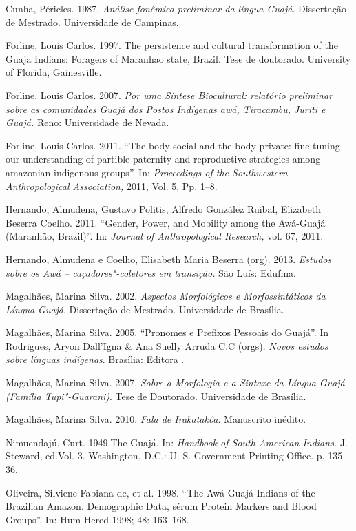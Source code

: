 \begin{Parskip}
Cunha, Péricles. 1987. \emph{Análise fonêmica preliminar da língua
Guajá}. Dissertação de Mestrado. Universidade de Campinas.

Forline, Louis Carlos. 1997. The persistence and cultural transformation
of the Guaja Indians: Foragers of Maranhao state, Brazil. Tese de
doutorado. University of Florida, Gainesville.

Forline, Louis Carlos. 2007. \emph{Por uma Síntese Biocultural:
relatório preliminar sobre as comunidades Guajá dos Postos Indígenas
awá, Tiracambu, Juriti e Guajá.} Reno: Universidade de Nevada.

Forline, Louis Carlos. 2011. ``The body social and the body private: fine
tuning our understanding of partible paternity and reproductive
strategies among amazonian indigenous groups''. In: \emph{Proceedings of
the Southwestern Anthropological Association,} 2011, Vol. 5, Pp. 1--8.

Hernando, Almudena, Gustavo Politis, Alfredo González Ruibal, Elizabeth
Beserra Coelho. 2011. ``Gender, Power, and Mobility among the Awá-Guajá
(Maranhão, Brazil)''. In: \emph{Journal of Anthropological Research,}
vol. 67, 2011.

Hernando, Almudena e Coelho, Elisabeth Maria Beserra (org). 2013.
\emph{Estudos sobre os Awá -- caçadores"-coletores em transição.} São
Luís: Edufma.

Magalhães, Marina Silva. 2002. \emph{Aspectos Morfológicos e
Morfossintáticos da Língua Guajá}. Dissertação de Mestrado. Universidade
de Brasília.

Magalhães, Marina Silva. 2005. ``Pronomes e Prefixos Pessoais do
Guajá''. In Rodrigues, Aryon Dall'Igna \& Ana Suelly Arruda C.C (orgs).
\emph{Novos estudos sobre línguas indígenas}. Brasília: Editora .

Magalhães, Marina Silva. 2007. \emph{Sobre a Morfologia e a Sintaxe da
Língua Guajá (Família Tupi"-Guarani)}. Tese de Doutorado. Universidade de
Brasília.

Magalhães, Marina Silva. 2010. \emph{Fala de Irakatakôa}. Manuscrito
inédito.

Nimuendajú, Curt. 1949.The Guajá. In: \emph{Handbook of South American
Indians.} J. Steward, ed.Vol. 3. Washington, D.C.: U. S. Government
Printing Office. p. 135--36.

Oliveira, Silviene Fabiana de, et al. 1998. ``The Awá-Guajá Indians of
the Brazilian Amazon. Demographic Data, sérum Protein Markers and Blood
Groups''. In: Hum Hered 1998; 48: 163--168.


\end{Parskip}
